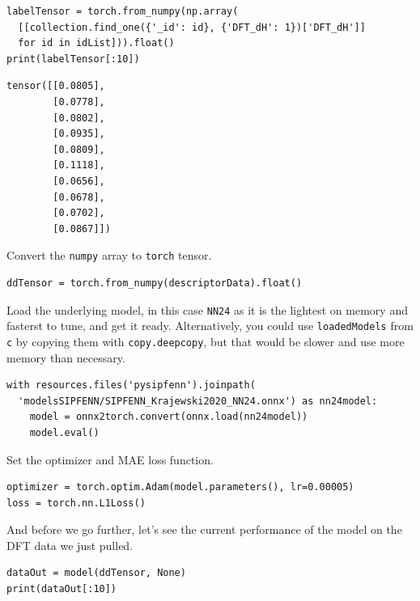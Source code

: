 \begin{verbatim}
labelTensor = torch.from_numpy(np.array(
  [[collection.find_one({'_id': id}, {'DFT_dH': 1})['DFT_dH']] 
  for id in idList])).float()
print(labelTensor[:10])
\end{verbatim}

\begin{verbatim}
tensor([[0.0805],
        [0.0778],
        [0.0802],
        [0.0935],
        [0.0809],
        [0.1118],
        [0.0656],
        [0.0678],
        [0.0702],
        [0.0867]])
\end{verbatim}

Convert the \texttt{numpy} array to
\texttt{torch} tensor.

\begin{verbatim}
ddTensor = torch.from_numpy(descriptorData).float()
\end{verbatim}

Load the underlying model, in this case \texttt{NN24}
as it is the lightest on memory and fasterst to tune, and get it ready.
Alternatively, you could use \texttt{loadedModels} from
\texttt{c} by copying them with
\texttt{copy.deepcopy}, but that would be slower and
use more memory than necessary.

\begin{verbatim}
with resources.files('pysipfenn').joinpath(
  'modelsSIPFENN/SIPFENN_Krajewski2020_NN24.onnx') as nn24model:
    model = onnx2torch.convert(onnx.load(nn24model))
    model.eval()
\end{verbatim}

Set the optimizer and MAE loss function.

\begin{verbatim}
optimizer = torch.optim.Adam(model.parameters(), lr=0.00005)
loss = torch.nn.L1Loss()
\end{verbatim}

And before we go further, let's see the current performance of the model
on the DFT data we just pulled.

\begin{verbatim}
dataOut = model(ddTensor, None)
print(dataOut[:10])
\end{verbatim}

